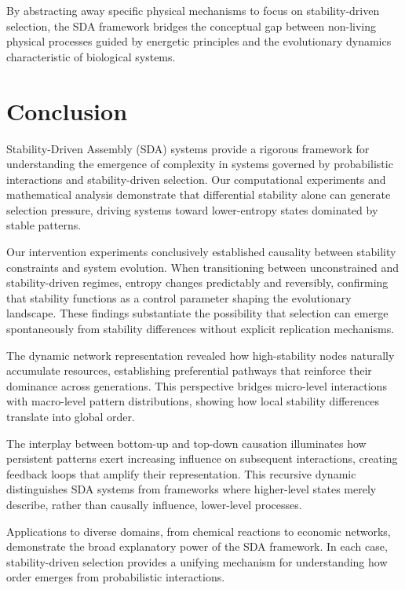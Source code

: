 \documentclass[preprint,12pt]{elsarticle}
\begin{document}
By abstracting away specific physical mechanisms to focus on stability-driven selection, the SDA framework bridges the conceptual gap between non-living physical processes guided by energetic principles and the evolutionary dynamics characteristic of biological systems.

\section{Conclusion}

Stability-Driven Assembly (SDA) systems provide a rigorous framework for understanding the emergence of complexity in systems governed by probabilistic interactions and stability-driven selection. Our computational experiments and mathematical analysis demonstrate that differential stability alone can generate selection pressure, driving systems toward lower-entropy states dominated by stable patterns.

Our intervention experiments conclusively established causality between stability constraints and system evolution. When transitioning between unconstrained and stability-driven regimes, entropy changes predictably and reversibly, confirming that stability functions as a control parameter shaping the evolutionary landscape. These findings substantiate the possibility that selection can emerge spontaneously from stability differences without explicit replication mechanisms.

The dynamic network representation revealed how high-stability nodes naturally accumulate resources, establishing preferential pathways that reinforce their dominance across generations. This perspective bridges micro-level interactions with macro-level pattern distributions, showing how local stability differences translate into global order.

The interplay between bottom-up and top-down causation illuminates how persistent patterns exert increasing influence on subsequent interactions, creating feedback loops that amplify their representation. This recursive dynamic distinguishes SDA systems from frameworks where higher-level states merely describe, rather than causally influence, lower-level processes.

Applications to diverse domains, from chemical reactions to economic networks, demonstrate the broad explanatory power of the SDA framework. In each case, stability-driven selection provides a unifying mechanism for understanding how order emerges from probabilistic interactions.
\end{document}
